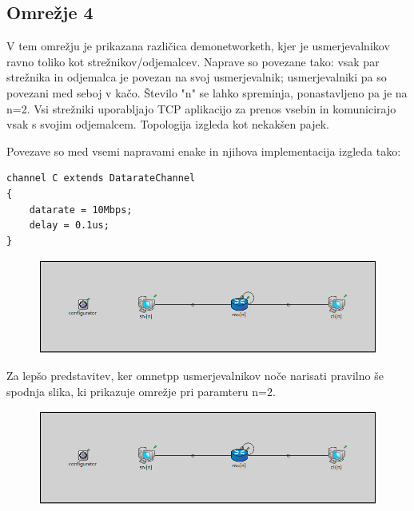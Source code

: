 \documentclass[11pt,a4paper,slovene]{myarticle}
\begin{document}
\subsection{Omrežje 4}
V tem omrežju je prikazana različica demonetworketh, kjer je usmerjevalnikov ravno toliko kot strežnikov/odjemalcev. Naprave so povezane tako: vsak par strežnika in odjemalca je povezan na svoj usmerjevalnik; usmerjevalniki pa so povezani med seboj v kačo. Število "n" se lahko spreminja, ponastavljeno pa je na n=2. Vsi strežniki uporabljajo TCP aplikacijo za prenos vsebin in komunicirajo vsak s svojim odjemalcem. Topologija izgleda kot nekakšen pajek.

Povezave so med vsemi napravami enake in njihova implementacija izgleda tako:
\begin{lstlisting}
channel C extends DatarateChannel
{
    datarate = 10Mbps;
    delay = 0.1us;
}
\end{lstlisting}

\begin{figure}[h]
  \includegraphics[width=\linewidth]{omrezje4.png}
\end{figure}

Za lepšo predstavitev, ker omnetpp usmerjevalnikov noče narisati pravilno še spodnja slika, ki prikazuje omrežje pri paramteru n=2.

\begin{figure}[h]
  \includegraphics[width=\linewidth]{omrezje4_n_eq_2.png}
\end{figure}
\end{document}
